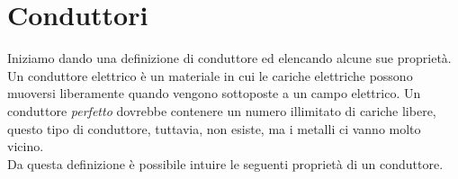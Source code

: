 \chapter{Conduttori}

Iniziamo dando una definizione di conduttore ed elencando alcune sue proprietà. \\

Un conduttore elettrico  è un materiale in cui le cariche elettriche possono muoversi liberamente quando vengono sottoposte a un campo elettrico. Un conduttore \emph{perfetto} dovrebbe contenere un numero illimitato di cariche libere, questo tipo di conduttore, tuttavia, non esiste,  ma i metalli ci vanno molto vicino. \\

Da questa definizione è possibile intuire le seguenti proprietà di un conduttore. 

